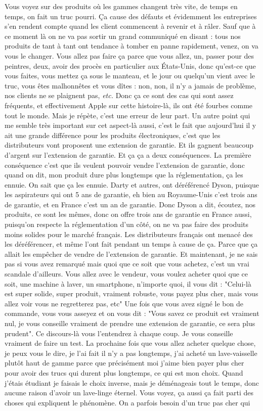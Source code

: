 \begin{small}
Vous voyez sur des produits où les gammes changent très vite, de temps en temps, on fait un truc pourri. Ça cause des défauts et évidemment les entreprises s'en rendent compte quand les client commencent à revenir et à râler. Sauf que à ce moment là on ne va pas sortir un grand communiqué en disant : tous nos produits de tant à tant ont tendance à tomber en panne rapidement, venez, on va vous le changer. Vous allez pas faire ça parce que vous allez, un, passer pour des peintres, deux, avoir des procès en particulier aux États-Unis, donc qu'est-ce que vous faites, vous mettez ça sous le manteau, et le jour ou quelqu'un vient avec le truc, vous êtes malhonnêtes et vous dîtes : non, non, il n'y a jamais de problème, nos clients ne se plaignent pas, \textit{etc.} Donc ça ce sont des cas qui sont assez fréquents, et effectivement Apple sur cette histoire-là, ils ont été fourbes comme tout le monde. Mais je répète, c'est une erreur de leur part. Un autre point qui me semble très important sur cet aspect-là aussi, c'est le fait que aujourd'hui il y ait une grande différence pour les produits électroniques, c'est que les distributeurs vont proposent une extension de garantie. Et ils gagnent beaucoup d'argent sur l'extension de garantie. Et ça ça a deux conséquences. La première conséquence c'est que ils veulent pouvoir vendre l'extension de garantie, donc quand on dit, mon produit dure plus longtemps que la réglementation, ça les ennuie. On sait que ça les ennuie. Darty et autres, ont déréférencé Dyson, puisque les aspirateurs qui ont 5 ans de garantie, eh bien au Royaume-Unis c'est trois ans de garantie, et en France c'est un an de garantie. Donc Dyson a dit, écoutez, nos produits, ce sont les mêmes, donc on offre trois ans de garantie en France aussi, puisqu'on respecte la réglementation d'un côté, on ne va pas faire des produits moins solides pour le marché français. Les distributeurs français ont menacé des les déréférencer, et même l'ont fait pendant un temps à cause de ça. Parce que ça allait les empêcher de vendre de l'extension de garantie. Et maintenant, je ne sais pas si vous avez remarqué mais quoi que ce soit que vous achetez, c'est un vrai scandale d'ailleurs. Vous allez avec le vendeur, vous voulez acheter quoi que ce soit, une machine à laver, un smartphone, n'importe quoi, il vous dit : "Celui-là est super solide, super produit, vraiment robuste, vous payez plus cher, mais vous allez voir vous ne regretterez pas, etc" Une fois que vous avez signé le bon de commande, vous vous asseyez et on vous dit : "Vous savez ce produit est vraiment nul, je vous conseille vraiment de prendre une extension de garantie, ce sera plus prudent". Ce discours-là vous l'entendrez à chaque coup. Je vous conseille vraiment de faire un test. La prochaine fois que vous allez acheter quelque chose, je peux vous le dire, je l'ai fait il n'y a pas longtemps, j'ai acheté un lave-vaisselle plutôt haut de gamme parce que précisément moi j'aime bien payer plus cher pour avoir des trucs qui durent plus longtemps, ce qui est mon choix. Quand j'étais étudiant je faisais le choix inverse, mais je déménageais tout le temps, donc aucune raison d'avoir un lave-linge éternel. Vous voyez, ça aussi ça fait parti des choses qui expliquent le phénomène. On a parfois besoin d'un truc pas cher qui 
\end{small}
